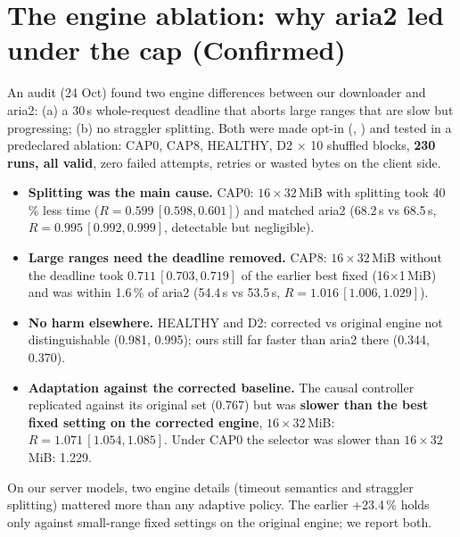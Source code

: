 \section{The engine ablation: why aria2 led under the cap (Confirmed)}
An audit (24 Oct) found two engine differences between our downloader and aria2: (a) a 30\,s whole-request deadline that aborts large ranges that are slow but progressing; (b) no straggler splitting. Both were made opt-in (, ) and tested in a predeclared ablation: CAP0, CAP8, HEALTHY, D2 $\times$ 10 shuffled blocks, \textbf{230 runs, all valid}, zero failed attempts, retries or wasted bytes on the client side.
\begin{itemize}
\item \textbf{Splitting was the main cause.} CAP0: $16\times32$\,MiB with splitting took 40\,\% less time ($R=0.599\,[0.598, 0.601]$) and matched aria2 (68.2\,s vs 68.5\,s, $R=0.995\,[0.992, 0.999]$, detectable but negligible).
\item \textbf{Large ranges need the deadline removed.} CAP8: $16\times32$\,MiB without the deadline took $0.711\,[0.703, 0.719]$ of the earlier best fixed (16$\times$1\,MiB) and was within 1.6\,\% of aria2 (54.4\,s vs 53.5\,s, $R=1.016\,[1.006, 1.029]$).
\item \textbf{No harm elsewhere.} HEALTHY and D2: corrected vs original engine not distinguishable (0.981, 0.995); ours still far faster than aria2 there (0.344, 0.370).
\item \textbf{Adaptation against the corrected baseline.} The causal controller replicated against its original set (0.767) but was \textbf{slower than the best fixed setting on the corrected engine}, $16\times32$\,MiB: $R=1.071\,[1.054, 1.085]$. Under CAP0 the selector was slower than $16\times32$\,MiB: 1.229.
\end{itemize}

\begin{keyidea}
On our server models, two engine details (timeout semantics and straggler splitting) mattered more than any adaptive policy. The earlier +23.4\,\% holds only against small-range fixed settings on the original engine; we report both.
\end{keyidea}


